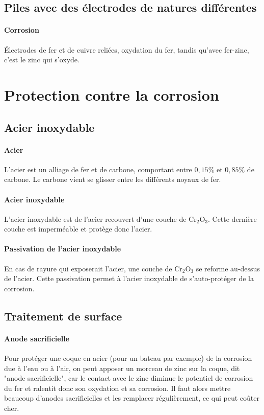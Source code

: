 \documentclass[french]{book}
\theoremstyle{plain}
\theoremstyle{definition}
\theoremstyle{remark}
\begin{document}
\subsection{Piles avec des électrodes de natures différentes}

\paragraph{Corrosion} Électrodes de fer et de cuivre reliées, oxydation du fer, tandis qu’avec fer-zinc, c’est le zinc qui s’oxyde.

\section{Protection contre la corrosion}

\subsection{Acier inoxydable}
\paragraph{Acier} L'acier est un alliage de fer et de carbone, comportant entre $0,15\%$ et $0,85\%$ de carbone.  Le carbone vient se glisser entre les différents noyaux de fer.

\paragraph{Acier inoxydable} L'acier inoxydable est de l'acier recouvert d'une couche de $\text{Cr}_2\text{O}_3$. Cette dernière couche est imperméable et protège donc l'acier.

\paragraph{Passivation de l'acier inoxydable} En cas de rayure qui exposerait l'acier, une couche de $\text{Cr}_2\text{O}_3$ se reforme au-dessus de l'acier. Cette passivation permet à l'acier inoxydable de s'auto-protéger de la corrosion.

\subsection{Traitement de surface}

\paragraph{Anode sacrificielle} Pour protéger une coque en acier (pour un bateau par exemple) de la corrosion due à l'eau ou à l'air, on peut apposer un morceau de zinc sur la coque, dit "anode sacrificielle", car le contact avec le zinc diminue le potentiel de corrosion du fer et ralentit donc son oxydation et sa corrosion. Il faut alors mettre beaucoup d'anodes sacrificielles et les remplacer régulièrement, ce qui peut coûter cher.
\end{document}
